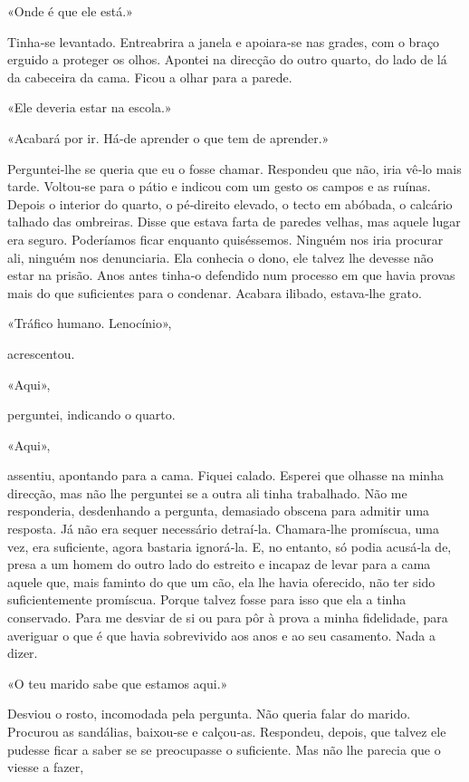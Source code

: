 «Onde é que ele está.»

Tinha­‑se levantado. Entreabrira a janela e apoiara­‑se nas grades, com
o braço erguido a proteger os olhos. Apontei na direcção do outro
quarto, do lado de lá da cabeceira da cama. Ficou a olhar para a parede.

«Ele deveria estar na escola.»

«Acabará por ir. Há­‑de aprender o que tem de aprender.»

Perguntei­‑lhe se queria que eu o fosse chamar. Respondeu que não, iria
vê­‑lo mais tarde. Voltou­‑se para o pátio e indicou com um gesto os
campos e as ruínas. Depois o interior do quarto, o pé­‑direito elevado,
o tecto em abóbada, o calcário talhado das ombreiras. Disse que estava
farta de paredes velhas, mas aquele lugar era seguro. Poderíamos ficar
enquanto quiséssemos. Ninguém nos iria procurar ali, ninguém nos
denunciaria. Ela conhecia o dono, ele talvez lhe devesse não estar na
prisão. Anos antes tinha­‑o defendido num processo em que havia provas
mais do que suficientes para o condenar. Acabara ilibado, estava­‑lhe
grato.

«Tráfico humano. Lenocínio»,

acrescentou.

«Aqui»,

perguntei, indicando o quarto.

«Aqui»,

assentiu, apontando para a cama. Fiquei calado. Esperei que olhasse na
minha direcção, mas não lhe perguntei se a outra ali tinha trabalhado.
Não me responderia, desdenhando a pergunta, demasiado obscena para
admitir uma resposta. Já não era sequer necessário detraí­‑la.
Chamara­‑lhe promíscua, uma vez, era suficiente, agora bastaria
ignorá­‑la. E, no entanto, só podia acusá­‑la de, presa a um homem do
outro lado do estreito e incapaz de levar para a cama aquele que, mais
faminto do que um cão, ela lhe havia oferecido, não ter sido
suficientemente promíscua. Porque talvez fosse para isso que ela a tinha
conservado. Para me desviar de si ou para pôr à prova a minha
fidelidade, para averiguar o que é que havia sobrevivido aos anos e ao
seu casamento. Nada a dizer.

«O teu marido sabe que estamos aqui.»

Desviou o rosto, incomodada pela pergunta. Não queria falar do marido.
Procurou as sandálias, baixou­‑se e calçou­‑as. Respondeu, depois, que
talvez ele pudesse ficar a saber se se preocupasse o suficiente. Mas não
lhe parecia que o viesse a fazer,

